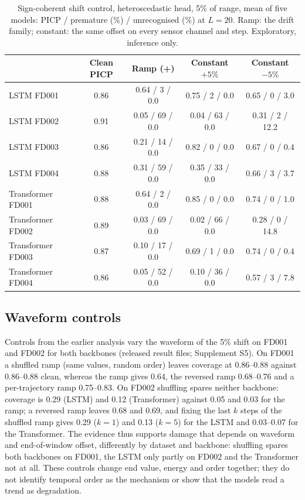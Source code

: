 \documentclass[11pt,a4paper]{article}
\newcommand{\NRampL}{0.05}
\newcommand{\NRampT}{0.03}
\newcommand{\NRevL}{0.68}
\newcommand{\NRevT}{0.69}
\newcommand{\NFixEndOneL}{0.29}
\newcommand{\NFixEndFiveL}{0.13}
\newcommand{\NFixEndT}{0.03--0.07}
\newcommand{\JWFoneRamp}{0.64}
\newcommand{\JWFoneShuf}{0.86--0.88}
\newcommand{\JWFoneRev}{0.68--0.76}
\newcommand{\JWFoneCont}{0.75--0.83}
\newcommand{\JWFtwoShufL}{0.29}
\newcommand{\JWFtwoShufT}{0.12}
\newcommand{\JWFoneClean}{0.86--0.88}
\begin{document}
\begin{table}[!t]
\caption{Sign-coherent shift control, heteroscedastic head, 5\% of range, mean of five models: PICP / premature (\%) / unrecognised (\%) at $L=20$. Ramp: the drift family; constant: the same offset on every sensor channel and step. Exploratory, inference only.}
\label{tab:coh}
\centering\footnotesize
\begin{tabular}{lcccc}
\toprule
 & Clean PICP & Ramp (+) & Constant $+5\%$ & Constant $-5\%$ \\
\midrule
LSTM FD001 & 0.86 & 0.64 / 3 / 0.0 & 0.75 / 2 / 0.0 & 0.65 / 0 / 3.0 \\
LSTM FD002 & 0.91 & 0.05 / 69 / 0.0 & 0.04 / 63 / 0.0 & 0.31 / 2 / 12.2 \\
LSTM FD003 & 0.86 & 0.21 / 14 / 0.0 & 0.82 / 0 / 0.0 & 0.67 / 0 / 0.4 \\
LSTM FD004 & 0.88 & 0.31 / 59 / 0.0 & 0.35 / 33 / 0.0 & 0.66 / 3 / 3.7 \\
\midrule
Transformer FD001 & 0.88 & 0.64 / 2 / 0.0 & 0.85 / 0 / 0.0 & 0.74 / 0 / 1.0 \\
Transformer FD002 & 0.89 & 0.03 / 69 / 0.0 & 0.02 / 66 / 0.0 & 0.28 / 0 / 14.8 \\
Transformer FD003 & 0.87 & 0.10 / 17 / 0.0 & 0.69 / 1 / 0.0 & 0.74 / 0 / 0.4 \\
Transformer FD004 & 0.86 & 0.05 / 52 / 0.0 & 0.10 / 36 / 0.0 & 0.57 / 3 / 7.8 \\
\bottomrule
\end{tabular}
\end{table}

\subsection{Waveform controls}\label{sec:controls}
Controls from the earlier analysis vary the waveform of the 5\% shift on FD001 and FD002 for both backbones (released result files; Supplement S5). On FD001 a shuffled ramp (same values, random order) leaves coverage at \JWFoneShuf{} against \JWFoneClean{} clean, whereas the ramp gives \JWFoneRamp{}, the reversed ramp \JWFoneRev{} and a per-trajectory ramp \JWFoneCont. On FD002 shuffling spares neither backbone: coverage is \JWFtwoShufL{} (LSTM) and \JWFtwoShufT{} (Transformer) against \NRampL{} and \NRampT{} for the ramp; a reversed ramp leaves \NRevL{} and \NRevT, and fixing the last $k$ steps of the shuffled ramp gives \NFixEndOneL{} ($k=1$) and \NFixEndFiveL{} ($k=5$) for the LSTM and \NFixEndT{} for the Transformer. The evidence thus supports damage that depends on waveform and end-of-window offset, differently by dataset and backbone: shuffling spares both backbones on FD001, the LSTM only partly on FD002 and the Transformer not at all. These controls change end value, energy and order together; they do not identify temporal order as the mechanism or show that the models read a trend as degradation.
\end{document}
